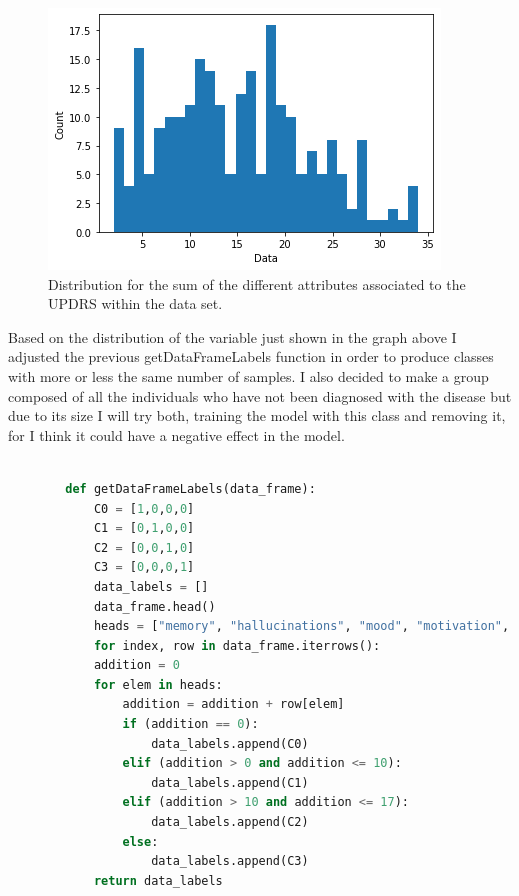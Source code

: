 \documentclass[12pt, a4paper]{article}
\begin{document}
	\begin{figure}[H]
		\centering
		\label{UPDRSSumDistribution}
		\includegraphics{img/plots/UPDRSsum.png}
		\caption{Distribution for the sum of the different attributes associated to the UPDRS within the data set.}
	\end{figure}
	
	Based on the distribution of the variable just shown in the graph above I adjusted the previous getDataFrameLabels function in order to produce classes with more or less the same number of samples. I also decided to make a group composed of all the individuals who have not been diagnosed with the disease but due to its size I will try both, training the model with this class and removing it, for I think it could have a negative effect in the model.
	
	\clearpage
	
	\begin{lstlisting}[language=Python]
		
		def getDataFrameLabels(data_frame):
			C0 = [1,0,0,0]
			C1 = [0,1,0,0]
			C2 = [0,0,1,0]
			C3 = [0,0,0,1]
			data_labels = []
			data_frame.head()
			heads = ["memory", "hallucinations", "mood", "motivation", "speech", "saliva", "swallowing", "handwriting","dressing", "cutting_food", "hygiene", "turning_in_bed", "falling", "freezing", "walking", "tremors", "numbness" ]
			for index, row in data_frame.iterrows():
			addition = 0
			for elem in heads:
				addition = addition + row[elem]
				if (addition == 0):
					data_labels.append(C0)
				elif (addition > 0 and addition <= 10):
					data_labels.append(C1)
				elif (addition > 10 and addition <= 17):
					data_labels.append(C2)
				else:
					data_labels.append(C3)
			return data_labels
	\end{lstlisting}
	
\end{document}
